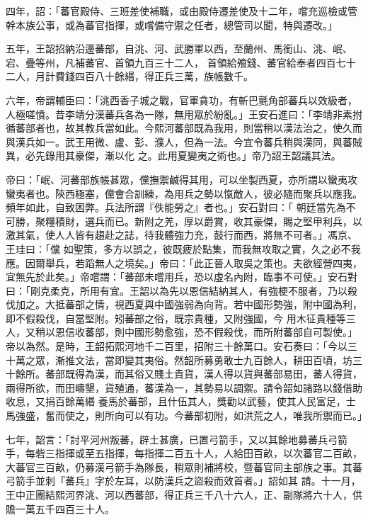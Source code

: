 \begin{pinyinscope}
 四年，詔：「蕃官殿侍、三班差使補職，或由殿侍遷差使及十二年，嚐充巡檢或管幹本族公事，或為蕃官指揮，或嚐備守禦之任者，總管司以聞，特與遷改。」



 五年，王韶招納沿邊蕃部，自洮、河、武勝軍以西，至蘭州、馬銜山、洮、岷、宕、疊等州，凡補蕃官、首領九百三十二人，
 首領給飧錢、蕃官給奉者四百七十二人，月計費錢四百八十餘緡，得正兵三萬，族帳數千。



 六年，帝謂輔臣曰：「洮西香子城之戰，官軍貪功，有斬巴氈角部蕃兵以效級者，人極嗟憤。昔李靖分漢蕃兵各為一隊，無用眾於紛亂。」王安石進曰：「李靖非素拊循蕃部者也，故其教兵當如此。今熙河蕃部既為我用，則當稍以漢法治之，使久而與漢兵如一。武王用微、盧、彭、濮人，但為一法。今宜令蕃兵稍與漢同，與蕃賊異，必先錄用其豪傑，漸以化
 之。此用夏變夷之術也。」帝乃詔王韶議其法。



 帝曰：「岷、河蕃部族帳甚眾，儻撫禦鹹得其用，可以坐製西夏，亦所謂以蠻夷攻蠻夷者也。陝西極塞，儻會合訓練，為用兵之勢以愾敵人，彼必隨而聚兵以應我。頻年如此，自致困弊。兵法所謂『佚能勞之』者也。」安石對曰：「 朝廷當先為不可勝，聚糧積財，選兵而已。新附之羌，厚以爵賞，收其豪傑，賜之堅甲利兵，以激其氣，使人人皆有趨赴之誌，待我體強力充，鼓行而西，將無不可者。」馮京、王珪曰：「儻
 如聖策，多方以誤之，彼既疲於點集，而我無攻取之實，久之必不我應。因爾舉兵，若蹈無人之境矣。」帝曰：「此正晉人取吳之策也。夫欲經營四夷，宜無先於此矣。」帝嚐謂：「蕃部未嚐用兵，恐以虛名內附，臨事不可使。」安石對曰：「剛克柔克，所用有宜。王韶以為先以恩信結納其人，有強梗不服者，乃以殺伐加之。大抵蕃部之情，視西夏與中國強弱為向背。若中國形勢強，附中國為利，即不假殺伐，自當堅附。矧蕃部之俗，既宗貴種，又附強國，今
 用木征貴種等三人，又稍以恩信收蕃部，則中國形勢愈強，恐不假殺伐，而所附蕃部自可製使。」帝以為然。是時，王韶拓熙河地千二百里，招附三十餘萬口。安石奏曰：「今以三十萬之眾，漸推文法，當即變其夷俗。然韶所募勇敢士九百餘人，耕田百頃，坊三十餘所。蕃部既得為漢，而其俗又賤土貴貨，漢人得以貨與蕃部易田，蕃人得貨，兩得所欲，而田疇墾，貨殖通，蕃漢為一，其勢易以調禦。請令韶如諸路以錢借助收息，又捐百餘萬緡
 養馬於蕃部，且什伍其人，獎勸以武藝，使其人民富足，士馬強盛，奮而使之，則所向可以有功。今蕃部初附，如洪荒之人，唯我所禦而已。」



 七年，韶言：「討平河州叛蕃，辟土甚廣，已置弓箭手，又以其餘地募蕃兵弓箭手，每砦三指揮或至五指揮，每指揮二百五十人，人給田百畝，以次蕃官二百畝，大蕃官三百畝，仍募漢弓箭手為隊長，稍眾則補將校，暨蕃官同主部族之事。其蕃弓箭手並刺『蕃兵』字於左耳，以防漢兵之盜殺而效首者。」詔如其
 請。十一月，王中正團結熙河界洮、河以西蕃部，得正兵三千八十六人，正、副隊將六十人，供贍一萬五千四百三十人。




\end{pinyinscope}
